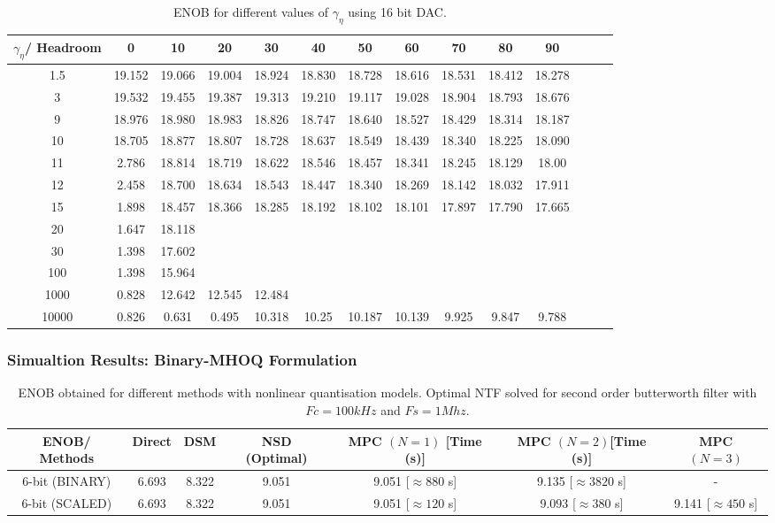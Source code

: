 \documentclass[a4paper]{article}
\begin{document}
\begin{table}[!h]
	\caption{ENOB for different values of $\gamma_{\eta}$ using 16 bit DAC.}
	\centering
	\begin{tabular}{|c|c|c|c|c|c|c|c|c|c|c|c|c|c|}
	\hline
	 $\gamma_{\eta}$/ Headroom&0  & 10 & 20 & 30 & 40 &50 & 60 & 70 & 80 & 90  \\
        \hline
        1.5 & 19.152 & 19.066 & 19.004 & 18.924 & 18.830 &18.728 & 18.616 & 18.531 & 18.412 & 18.278  \\
	\hline
	 3 & 19.532 & 19.455 & 19.387 & 19.313 & 19.210 &19.117 & 19.028 & 18.904 & 18.793 & 18.676  \\
	\hline
	 9 & 18.976 & 18.980 & 18.983 & 18.826 & 18.747 &18.640 & 18.527 & 18.429 & 18.314 & 18.187  \\
	 \hline
	 10 & 18.705 & 18.877 &18.807 & 18.728 & 18.637 &18.549 & 18.439 & 18.340 & 18.225 & 18.090  \\
	 \hline
  11 & 2.786 & 18.814 &18.719 & 18.622 & 18.546 &18.457 & 18.341 & 18.245 & 18.129 & 18.00  \\
	 \hline
  12 & 2.458 & 18.700 &18.634 & 18.543 & 18.447 &18.340 & 18.269 & 18.142 & 18.032 & 17.911  \\
	 \hline
   15 & 1.898 & 18.457 &18.366 & 18.285 & 18.192 &18.102 & 18.101 & 17.897 & 17.790 & 17.665  \\
	 \hline
  20 & 1.647 & 18.118 & &  &  & &  & &  &  \\
	 \hline
 30 & 1.398 & 17.602 & &  &  & &  & &  &  \\
	 \hline
   100 & 1.398 & 15.964 & &  &  & &  & &  &  \\
	 \hline
     1000 & 0.828 & 12.642 &12.545& 12.484 &  & &  & &  &  \\
	 \hline
   10000 & 0.826 & 0.631 & 0.495 & 10.318 &10.25  &10.187 & 10.139 & 9.925 & 9.847 & 9.788 \\
	 \hline
	\end{tabular}		
\end{table}


\subsubsection*{Simualtion Results: Binary-MHOQ Formulation}

\begin{table}[!h]
\caption{ENOB obtained for different methods with nonlinear quantisation models. Optimal NTF solved for second order butterworth filter with $Fc = 100 \mathit{kHz}$ and $Fs = 1 \mathit{Mhz}$.}
	\centering
	\begin{tabular}{|c|c|c|c|c|c|c|}
	\hline
	ENOB/ Methods & Direct & DSM & NSD (Optimal) & MPC $(N = 1)$ [Time (s)] & MPC $(N= 2)$[Time (s)] & MPC $(N= 3)$  \\
        \hline
        6-bit (BINARY) & 6.693 & 8.322 & 9.051  & 9.051 [$\approx 880$ s] & 9.135 [$\approx 3820$ s] & - \\
        \hline
        6-bit (SCALED) & 6.693 & 8.322 & 9.051  & 9.051 [$\approx 120$ s] & 9.093 [$\approx 380$ s]&  9.141 [$\approx 450$ s]\\
         \hline
	\end{tabular}		
\end{table}
\end{document}
